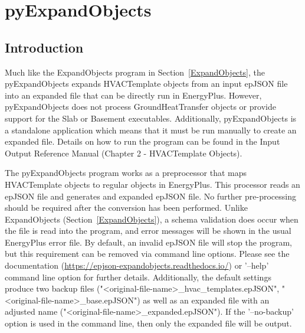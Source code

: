 \section{pyExpandObjects}

\subsection{Introduction}\label{pyExpandObjects}

Much like the ExpandObjects program in Section~\ref{ExpandObjects}, the pyExpandObjects expands HVACTemplate objects from an input epJSON file into an expanded file that can be directly run in EnergyPlus.  However, pyExpandObjects does not process GroundHeatTransfer objects or provide support for the Slab or Basement executables.  Additionally, pyExpandObjects is a standalone application which means that it must be run manually to create an expanded file.  Details on how to run the program can be found in the Input Output Reference Manual (Chapter 2 - HVACTemplate Objects).

The pyExpandObjects program works as a preprocessor that maps HVACTemplate objects to regular objects in EnergyPlus.  This processor reads an epJSON file and generates and expanded epJSON file.  No further pre-processing should be required after the conversion has been performed.  Unlike ExpandObjects (Section~\ref{ExpandObjects}), a schema validation does occur when the file is read into the program, and error messages will be shown in the usual EnergyPlus error file.  By default, an invalid epJSON file will stop the program, but this requirement can be removed via command line options.  Please see the documentation (\url{https://epjson-expandobjects.readthedocs.io/}) or '--help' command line option for further details.  Additionally, the default settings produce two backup files ("<original-file-name>\_hvac\_templates.epJSON", "<original-file-name>\_base.epJSON") as well as an expanded file with an adjusted name ("<original-file-name>\_expanded.epJSON"). If the '--no-backup' option is used in the command line, then only the expanded file will be output.